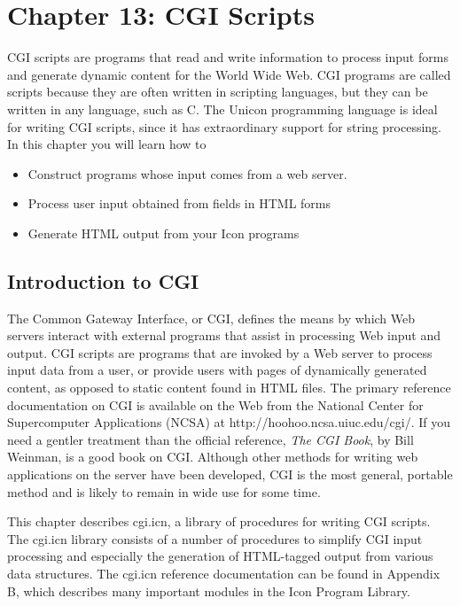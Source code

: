 \clearpage\section{Chapter 13: CGI Scripts}

CGI scripts are programs that read and write information to
process input forms and generate dynamic content for the World Wide
Web. CGI programs are called {\textquotedbl}scripts{\textquotedbl}
because they are often written in scripting
languages, but they can be written in any language, such as C. The
Unicon programming language is ideal for writing CGI scripts, since it
has extraordinary support for string processing. In this chapter you
will learn how to

\begin{itemize}
\item Construct programs whose input comes from a web server.
\item Process user input obtained from fields in HTML forms
\item Generate HTML output from your Icon programs
\end{itemize}

\subsection{Introduction to CGI}

The Common Gateway Interface, or CGI, defines the means by which Web
servers interact with external programs that assist in processing Web
input and output. CGI scripts are programs that are invoked by a Web
server to process input data from a user, or provide users with pages
of dynamically generated content, as opposed to static content found in
HTML files. The primary
reference documentation on CGI is
available on the Web from the National Center for Supercomputer
Applications (NCSA) at \textsf{http://hoohoo.ncsa.uiuc.edu/cgi/}. If
you need a gentler treatment than the official reference, \textit{The
CGI Book}, by Bill Weinman, is a good book on CGI. Although other
methods for writing web applications on the server have been developed,
CGI is the most general, portable method and is likely to remain in
wide use for some time.

This chapter describes \textsf{cgi.icn}, a library of procedures for
writing CGI scripts. The \textsf{cgi.icn} library consists of a number
of procedures to simplify CGI input processing and especially the
generation of HTML-tagged output from various data structures. The
\textsf{cgi.icn} reference documentation can be found in Appendix B,
which describes many important modules in the Icon Program Library.

